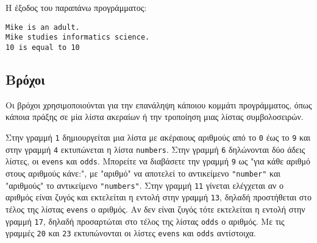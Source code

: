 \documentclass[14pt]{extreport}
\begin{document}
Η έξοδος του παραπάνω προγράμματος:

\begin{lstlisting}[language={}]
Mike is an adult.
Mike studies informatics science.
10 is equal to 10
\end{lstlisting}

\subsection{Βρόχοι}

Οι βρόχοι χρησιμοποιούνται για την επανάληψη κάποιου κομμάτι προγράμματος, όπως κάποια πράξης σε μία λίστα ακεραίων ή την τροποίηση μιας λίστας συμβολοσειρών.



Στην γραμμή \lstinline{1} δημιουργείται μια λίστα με ακέραιους αριθμούς από το \lstinline{0} έως το \lstinline{9} και στην γραμμή \lstinline{4} εκτυπώνεται η λίστα \lstinline{numbers}. Στην γραμμή \lstinline{6} δηλώνονται δύο άδεις λίστες, οι \lstinline{evens} και \lstinline{odds}. Μπορείτε να διαβάσετε την γραμμή \lstinline{9} ως "για κάθε αριθμό στους αριθμούς κάνε:", με "αριθμό" να αποτελεί το αντικείμενο \lstinline{"number"} και "αριθμούς" το αντικείμενο \lstinline{"numbers"}. Στην γραμμή \lstinline{11} γίνεται ελέγχεται αν ο αριθμός είναι ζυγός και εκτελείται η εντολή στην γραμμή \lstinline{13}, δηλαδή προστήθεται στο τέλος της λίστας \lstinline{evens} ο αριθμός. Αν δεν είναι ζυγός τότε εκτελείται η εντολή στην γραμμή \lstinline{17}, δηλαδή προσαρτώται στο τέλος της λίστας \lstinline{odds} ο αριθμός. Με τις γραμμές \lstinline{20} και \lstinline{23} εκτυπώνονται οι λίστες \lstinline{evens} και \lstinline{odds} αντίστοιχα.
\end{document}
